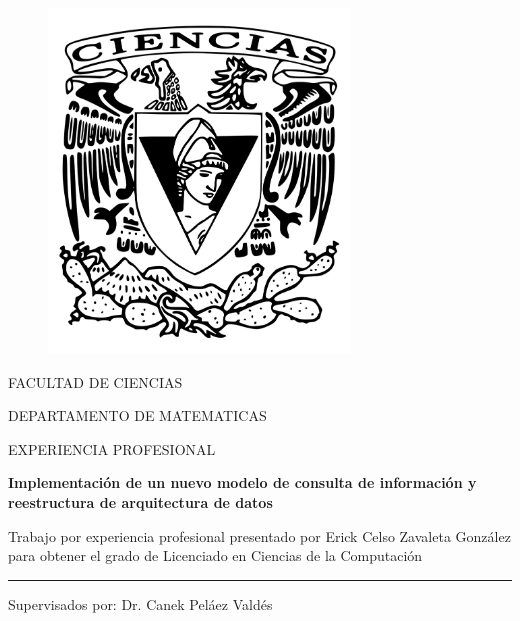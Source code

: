 \documentclass[a4paper,openright,12pt]{book}
\begin{document}
\begin{titlepage}

  \begin{center}

    \vspace*{-1in}
    \begin{figure}[htb]
      \begin{center}
        \includegraphics[width=8cm]{ciencias2}
      \end{center}
    \end{figure}

    FACULTAD DE CIENCIAS

    \vspace*{0.15in}

    DEPARTAMENTO DE MATEMATICAS

    \vspace*{0.6in}

    \begin{large}
      EXPERIENCIA PROFESIONAL
    \end{large}

    \vspace*{0.2in}

    \begin{Large}
      \textbf{Implementación de un nuevo modelo de consulta de información y
        reestructura de arquitectura de datos}
    \end{Large}

    \vspace*{0.3in}

    \begin{large}
      Trabajo por experiencia profesional presentado por Erick Celso Zavaleta
      González para obtener el grado de Licenciado en Ciencias de la Computación
    \end{large}

    \vspace*{0.3in}
    \rule{80mm}{0.1mm}
    \vspace*{0.1in}

    \begin{large}
      Supervisados por: Dr. Canek Peláez Valdés
    \end{large}

  \end{center}

\end{titlepage}
\end{document}
